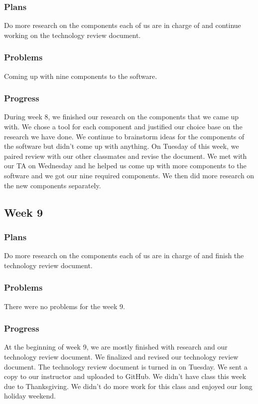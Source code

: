 \documentclass[onecolumn, draftclsnofoot, 10pt, compsoc]{IEEEtran}
\begin{document}
\subsubsection{Plans}
Do more research on the components each of us are in charge of and continue working on the technology review document.

\subsubsection{Problems}
Coming up with nine components to the software.
\subsubsection{Progress}
During week 8, we finished our research on the components that we came up with. We chose a tool for each component and justified our choice base on the research we have done. We continue to brainstorm ideas for the components of the software but didn't come up with anything. On Tuesday of this week, we paired review with our other classmates and revise the document. We met with our TA on Wednesday and he helped us come up with more components to the software and we got our nine required components. We then did more research on the new components separately.

\subsection{Week 9}
\subsubsection{Plans}
Do more research on the components each of us are in charge of and finish the technology review document.
\subsubsection{Problems}
There were no problems for the week 9.
\subsubsection{Progress}
At the beginning of week 9, we are mostly finished with research and our technology review document. We finalized and revised our technology review document. The technology review document is turned in on Tuesday. We sent a copy to our instructor and uploaded to GitHub. We didn't have class this week due to Thanksgiving. We didn't do more work for this class and enjoyed our long holiday weekend. 
\end{document}
